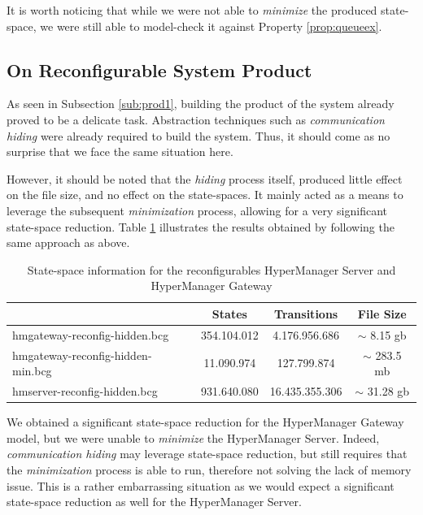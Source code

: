 	It is worth noticing that while we were not able to \textit{minimize} the produced state-space, we were still
	able to model-check it against Property \ref{prop:queueex}.
	
\subsection{On Reconfigurable System Product}
\label{sub:prodr}
		
	As seen in Subsection \ref{sub:prod1}, building the product of the system already proved to
	be a delicate task. Abstraction techniques such as \textit{communication hiding} were already required
	to build the system. Thus, it should come as no surprise that we face the same situation here. 
	
		However, it should be noted that the \textit{hiding} process itself, produced little
	effect on the file size, and no effect on the state-spaces. It mainly acted as a means
	to leverage the subsequent \textit{minimization} process, allowing for a very 
	significant state-space reduction. Table \ref{tab:model2} illustrates the results obtained
	by following the same approach as above.
	
	

\begin{table}[H]
\begin{center}
\begin{tabular}{| l | c | c | c |}
\hline
                             &  \textbf{States} & \textbf{Transitions} & \textbf{File Size} \\
\hline
  \textsf{hmgateway-reconfig-hidden.bcg}                             & 354.104.012   &  4.176.956.686 &    $\sim$  8.15 gb\\
  \textsf{hmgateway-reconfig-hidden-min.bcg}           & 11.090.974     &  127.799.874   &    $\sim$  283.5 mb\\
  \hline
\textsf{hmserver-reconfig-hidden.bcg}                             &  931.640.080    & 16.435.355.306   &   $\sim$  31.28 gb\\  
  \hline
\end{tabular}
\end{center}
\caption{State-space information for the reconfigurables \textsf{HyperManager Server} and \textsf{HyperManager Gateway}}
\label{tab:model2}
\end{table}

	
	We obtained a significant state-space reduction for the \textsf{HyperManager Gateway} model, but we were unable to
	\textit{minimize} the \textsf{HyperManager Server}. Indeed, \textit{communication hiding} may leverage
	state-space reduction, 	but still requires that the \textit{minimization} process is able to run, 
	therefore not solving the lack of memory issue. This is a rather embarrassing situation as 
   we would expect a significant state-space reduction as well for the \textsf{HyperManager Server}.
	

